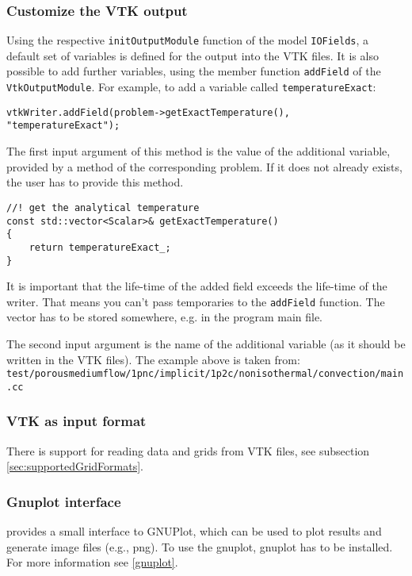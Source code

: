 \subsubsection{Customize the VTK output}
Using the respective \texttt{initOutputModule} function of the model \texttt{IOFields}, a default
set of variables is defined for the output into the VTK files. It is also possible to add further variables,
using the member function \texttt{addField} of the \texttt{VtkOutputModule}. For example, to add a variable called \texttt{temperatureExact}:
\begin{lstlisting}[style=DumuxCode]
vtkWriter.addField(problem->getExactTemperature(), "temperatureExact");
\end{lstlisting}

The first input argument of this method is the value of the additional variable, provided by a method of the corresponding problem.
If it does not already exists, the user has to provide this method.
\begin{lstlisting}[style=DumuxCode]
//! get the analytical temperature
const std::vector<Scalar>& getExactTemperature()
{
    return temperatureExact_;
}
\end{lstlisting}
It is important that the life-time of the added field exceeds the life-time of the writer. That means you can't pass temporaries
to the \texttt{addField} function. The vector has to be stored somewhere, e.g. in the program main file.

The second input argument is the name of the additional variable (as it should be written in the VTK files).
The example above is taken from: \\ \texttt{test/porousmediumflow/1pnc/implicit/1p2c/nonisothermal/convection/main.cc}

\subsubsection{VTK as input format}
There is support for reading data and grids from VTK files, see subsection \ref{sec:supportedGridFormats}.

\subsubsection{Gnuplot interface}
\Dumux provides a small interface to GNUPlot, which can be used to plot results and generate
image files (e.g., png). To use the gnuplot, gnuplot has to be installed. For more information see \ref{gnuplot}.

